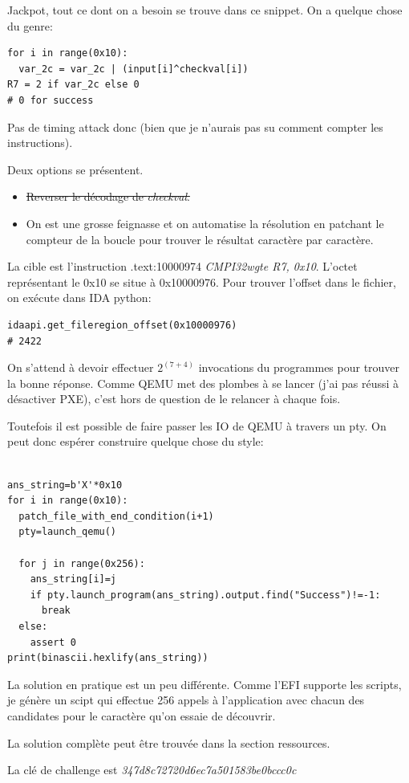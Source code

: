 \documentclass[14pt]{article}
\begin{document}
Jackpot, tout ce dont on a besoin se trouve dans ce snippet.
On a quelque chose du genre:
\begin{verbatim}
for i in range(0x10):
  var_2c = var_2c | (input[i]^checkval[i])
R7 = 2 if var_2c else 0
# 0 for success
\end{verbatim}
Pas de timing attack donc (bien que je n'aurais pas su comment compter les instructions).

Deux options se présentent.
\begin{itemize}
\item \sout{ Reverser le décodage de {\em checkval}.}
\item On est une grosse feignasse et on automatise la résolution en patchant le compteur de la boucle pour trouver le résultat caractère par caractère.
\end{itemize}

La cible est l'instruction {.text:10000974 \em CMPI32wgte R7, 0x10}.
L'octet représentant le 0x10 se situe à 0x10000976.
Pour trouver l'offset dans le fichier, on exécute dans IDA python:
\begin{verbatim}
idaapi.get_fileregion_offset(0x10000976)
# 2422
\end{verbatim}

On s'attend à devoir effectuer $2^{(7+4)}$ invocations du programmes pour trouver la bonne réponse.
Comme QEMU met des plombes à se lancer (j'ai pas réussi à désactiver PXE), c'est hors de question de le relancer à chaque fois.

Toutefois il est possible de faire passer les IO de QEMU à travers un pty.
On peut donc espérer construire quelque chose du style:
\begin{verbatim}

ans_string=b'X'*0x10
for i in range(0x10):
  patch_file_with_end_condition(i+1)
  pty=launch_qemu()

  for j in range(0x256):
    ans_string[i]=j
    if pty.launch_program(ans_string).output.find("Success")!=-1:
      break
  else:
    assert 0
print(binascii.hexlify(ans_string))
\end{verbatim}

La solution en pratique est un peu différente. Comme l'EFI supporte les scripts, je génère un scipt qui effectue 256 appels à l'application avec chacun des candidates pour le caractère qu'on essaie de découvrir.

La solution complète peut être trouvée dans la section ressources.

La clé de challenge est {\em 347d8c72720d6ec7a501583be0bccc0c}
\end{document}
